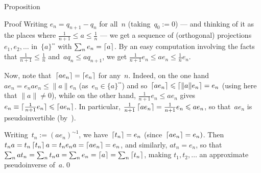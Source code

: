 \documentclass[a]{subfiles}
\begin{document}
\begin{parsec}
\begin{point}{Proposition}
\begin{point}{Proof}
Writing $e_{n}=q_{n+1}-q_n$
for all~$n$ (taking~$q_0:=0$)
--- and thinking of it as the places
where $\frac{1}{n+1}\leq a\leq \frac{1}{n}$ --- 
we get a sequence of (orthogonal) projections
$e_1,e_2,\dotsc$ in~$\{a\}^{\square\square}$
with $\sum_n e_n = \left\lceil a\right\rceil$.
By an easy computation
involving the facts that $\frac{1}{n+1}\leq \frac{1}{n}$
and~$aq_n\leq aq_{n+1}$,
we get $\frac{1}{n+1}e_n \leq ae_n \leq  \frac{1}{n}e_n$.

Now, note that~$\left\lceil ae_n\right\rceil=\left\lceil e_n\right\rceil$ for any~$n$.
Indeed, on the one hand~$ae_n=e_nae_n\leq \|a\|e_n$
(as~$e_n\in\{a\}^{\square\square}$)
and so~$\left\lceil ae_n\right\rceil\leqslant \left\lceil\|a\|e_n\right\rceil=e_n$
(using here that $\|a\|\neq 0$),
while on the other hand, $\frac{1}{n+1}e_n\leq ae_n$
gives $e_n\equiv \left\lceil\smash{\frac{1}{n+1}e_n}\right\rceil\leqslant \left\lceil ae_n\right\rceil$.
In particular, $\frac{1}{n+1}\left\lceil ae_n\right\rceil=\frac{1}{n+1}e_n \leqslant ae_n$,
so that~$ae_n$ is pseudoinvertible (by~).

Writing~$t_n := (ae_n)^{\sim1}$,
we have~$\left\lceil t_n\right\rceil=e_n$
(since~$\left\lceil ae_n\right\rceil=e_n)$.
Then $t_na=t_n\left\lceil t_n\right\rceil a=t_ne_na=\left\lceil ae_n\right\rceil=e_n$,
and similarly, $at_n = e_n$,
so that $\sum_n at_n = \sum_n t_n a 
=\sum_n e_n =\left\lceil a\right\rceil
= \sum_n \left\lceil t_n\right\rceil$,
making $t_1,t_2,\dotsc$ an approximate pseudoinverse of~$a$.\qed
\end{point}
\end{point}
\end{parsec}
\end{document}
